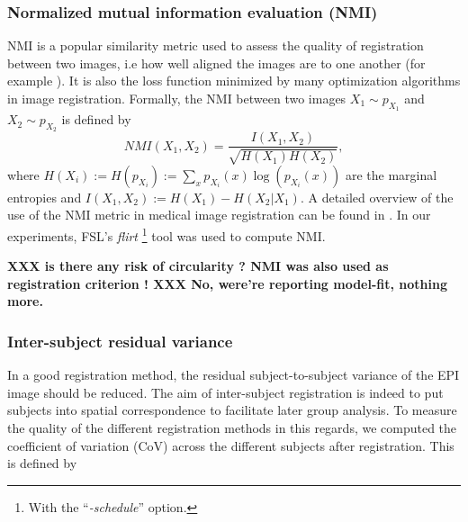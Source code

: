 
\subsubsection{Normalized mutual information evaluation (NMI)}
NMI is a
popular similarity metric used to assess the quality of
registration between two images, i.e how well aligned the images are to one another
(for example \citep{maes1997multimodality}). It is also the loss function minimized by many
optimization algorithms in image registration.  Formally, the NMI between two images $X_1 \sim p_{X_1}$
and $X_2 \sim p_{X_2}$ is defined by
\begin{equation}
  NMI(X_1,X_2) = \frac{I(X_1,X_2)}{\sqrt{H(X_1)H(X_2)}},
\end{equation}
where $H(X_i) := H(p_{X_i}) := \sum_{x}p_{X_i}(x)\log(p_{X_i}(x))$  are the marginal entropies and
$I(X_1,X_2) := H(X_1) - H(X_2|X_1)$.
A detailed overview of
the use of the NMI metric in medical image registration can be found
in \citep{pluim2003}.
In our experiments, FSL's \textit{flirt} \footnote{With the
   ``\textit{-schedule}'' option.}
tool \citep{smith2004} was used to compute NMI. 

\textbf{XXX is there any risk of circularity ? NMI was also used as registration criterion !
XXX No, were're reporting model-fit, nothing more.}



\subsubsection{Inter-subject residual variance}
In a good registration method, the residual subject-to-subject
variance of the EPI image should be reduced. The aim of
inter-subject registration is indeed to put subjects into spatial
correspondence to facilitate later group analysis. To measure the quality of
the different registration methods in this regards, we computed the
coefficient of variation (CoV) across the different subjects after registration.
This is defined by

